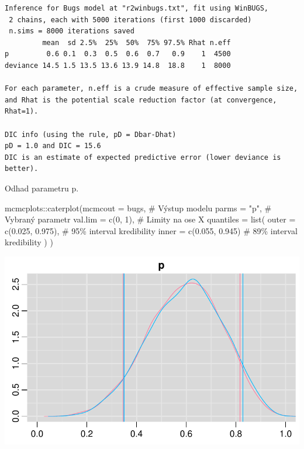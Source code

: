 \documentclass[
  11pt,
  a4paper]{report}
\newenvironment{Shaded}{\begin{snugshade}}{\end{snugshade}}
\newcommand{\AttributeTok}[1]{\textcolor[rgb]{0.40,0.45,0.13}{#1}}
\newcommand{\CommentTok}[1]{\textcolor[rgb]{0.37,0.37,0.37}{#1}}
\newcommand{\DecValTok}[1]{\textcolor[rgb]{0.68,0.00,0.00}{#1}}
\newcommand{\FloatTok}[1]{\textcolor[rgb]{0.68,0.00,0.00}{#1}}
\newcommand{\FunctionTok}[1]{\textcolor[rgb]{0.28,0.35,0.67}{#1}}
\newcommand{\NormalTok}[1]{\textcolor[rgb]{0.00,0.23,0.31}{#1}}
\newcommand{\SpecialCharTok}[1]{\textcolor[rgb]{0.37,0.37,0.37}{#1}}
\newcommand{\StringTok}[1]{\textcolor[rgb]{0.13,0.47,0.30}{#1}}
\begin{document}
\begin{verbatim}
Inference for Bugs model at "r2winbugs.txt", fit using WinBUGS,
 2 chains, each with 5000 iterations (first 1000 discarded)
 n.sims = 8000 iterations saved
         mean  sd 2.5%  25%  50%  75% 97.5% Rhat n.eff
p         0.6 0.1  0.3  0.5  0.6  0.7   0.9    1  4500
deviance 14.5 1.5 13.5 13.6 13.9 14.8  18.8    1  8000

For each parameter, n.eff is a crude measure of effective sample size,
and Rhat is the potential scale reduction factor (at convergence, Rhat=1).

DIC info (using the rule, pD = Dbar-Dhat)
pD = 1.0 and DIC = 15.6
DIC is an estimate of expected predictive error (lower deviance is better).
\end{verbatim}

Odhad parametru p.

\begin{Shaded}
\begin{Highlighting}[]
\NormalTok{mcmcplots}\SpecialCharTok{::}\FunctionTok{caterplot}\NormalTok{(}\AttributeTok{mcmcout =}\NormalTok{ bugs,             }\CommentTok{\# Výstup modelu}
                     \AttributeTok{parms =} \StringTok{"p"}\NormalTok{,                }\CommentTok{\# Vybraný parametr}
                     \AttributeTok{val.lim =} \FunctionTok{c}\NormalTok{(}\DecValTok{0}\NormalTok{, }\DecValTok{1}\NormalTok{),          }\CommentTok{\# Limity na ose X}
                     \AttributeTok{quantiles =} \FunctionTok{list}\NormalTok{(}
                        \AttributeTok{outer =} \FunctionTok{c}\NormalTok{(}\FloatTok{0.025}\NormalTok{, }\FloatTok{0.975}\NormalTok{), }\CommentTok{\# 95\% interval kredibility}
                        \AttributeTok{inner =} \FunctionTok{c}\NormalTok{(}\FloatTok{0.055}\NormalTok{, }\FloatTok{0.945}\NormalTok{)  }\CommentTok{\# 89\% interval kredibility}
\NormalTok{                     )}
\NormalTok{)}
\end{Highlighting}
\end{Shaded}

\includegraphics{index_files/figure-pdf/unnamed-chunk-7-1.pdf}
\end{document}

